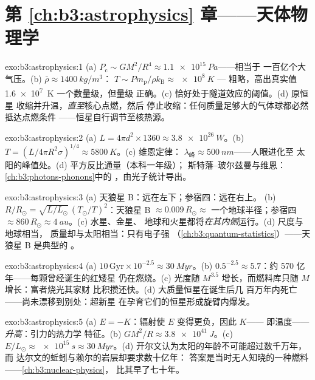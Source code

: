 \section*{第 \ref{ch:b3:astrophysics} 章——天体物理学}

\begin{solution}{exo:b3:astrophysics:1}
(a) $P_{\text{c}} \sim GM^2/R^4 \approx \qty{1.1e15}{Pa}$——相当于
一百亿个大气压。(b) $\bar\rho \approx \qty{1400}{kg/m^3}$：
$T \sim P m_{\text{p}}/\rho k_{\text{B}} \approx \qty{e8}{K}$ ---
粗略，高出真实值 \qty{1.6e7}{K} 一个数量级，但量级
正确。(c) 恰好处于隧道效应的阈值。(d) 原恒星
收缩并升温，\emph{直至}核心点燃，然后
停止收缩：任何质量足够大的气体球都必然抵达点燃条件
——恒星自行调节至核热源。
\end{solution}

\begin{solution}{exo:b3:astrophysics:2}
(a) $L = 4\pi d^2\times1360 \approx \qty{3.8e26}{W}$。(b) $T =
(L/4\pi R^2\sigma)^{1/4} \approx \qty{5800}{K}$。(c) 维恩定律：
$\lambda_{\text{峰}} \approx \qty{500}{nm}$——人眼进化至
太阳的峰值处。(d) 平方反比通量（本科一年级）；
斯特藩–玻尔兹曼与维恩：\cref{ch:b3:photons-phonons}中的
，由光子统计导出。
\end{solution}

\begin{solution}{exo:b3:astrophysics:3}
(a) 天狼星 B：远在左下；参宿四：远在右上。
(b) $R/R_\odot = \sqrt{L/L_\odot}\,(T_\odot/T)^2$：天狼星 B
$\approx 0.009\,R_\odot \approx$ 一个地球半径；参宿四
$\approx 860\,R_\odot \approx \qty{4}{au}$。(c) 水星、金星、
地球和火星都将\emph{在其内侧}运行。(d) 尺度与地球相当，
质量却与太阳相当：只有电子强
（\cref{ch:b3:quantum-statistics}）——天狼星 B 是典型的
。
\end{solution}

\begin{solution}{exo:b3:astrophysics:4}
(a) $10\,\text{Gyr}\times10^{-2.5} \approx \qty{30}{Myr}$。(b)
$0.5^{-2.5} \approx 5.7$：约 570 亿年——每颗曾经诞生的红矮星
仍在燃烧。(c) 光度随
$M^{3.5}$ 增长，而燃料库只随 $M$ 增长：富者烧光其家财
比积攒还快。(d) 大质量恒星在诞生后几
百万年内死亡——尚未漂移到别处：超新星
在孕育它们的恒星形成旋臂内爆发。
\end{solution}

\begin{solution}{exo:b3:astrophysics:5}
(a) $E = -K$：辐射使 $E$ 变得更负，因此 $K$——
即温度——\emph{升高}：引力的热力学
特征。(b) $GM^2/R \approx \qty{3.8e41}{J}$。(c)
$E/L_\odot \approx \qty{e15}{s} \approx \qty{30}{Myr}$。(d)
开尔文认为太阳的年龄不可能超过数千万年，而
达尔文的蚯蚓与赖尔的岩层却要求数十亿年：
答案是当时无人知晓的一种燃料——\cref{ch:b3:nuclear-physics}，
比其早了七十年。
\end{solution}

